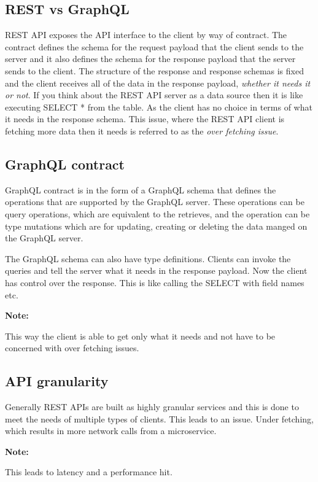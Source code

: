 \documentclass[a4paper, 11pt]{book}
\newenvironment{note}{
    \begin{siderule}
        \textbf{Note: }
        }{
    \end{siderule}
}
\begin{document}
    \subsection{REST vs GraphQL}
    REST API exposes the API interface to the client by way of contract.
    The contract defines the schema for the request payload that the client sends to the server and it also defines the schema for the response payload that the server sends to the client.
    The structure of the response and response schemas is fixed and the client receives all of the data in the response payload, \textit{whether it needs it or not}.
    If you think about the REST API server as a data source then it is like executing SELECT * from the table.
    As the client has no choice in terms of what it needs in the response schema.
    This issue, where the REST API client is fetching more data then it needs is referred to as the \textit{over fetching issue}.

    \subsection{GraphQL contract}
    GraphQL contract is in the form of a GraphQL schema that defines the operations that are supported by the GraphQL server.
    These operations can be query operations, which are equivalent to the retrieves, and the operation can be type mutations which are for updating, creating or deleting the data manged on the GraphQL server.

    The GraphQL schema can also have type definitions.
    Clients can invoke the queries and tell the server what it needs in the response payload.
    Now the client has control over the response.
    This is like calling the SELECT with field names etc.
    \begin{note}
        This way the client is able to get only what it needs and not have to be concerned with over fetching issues.
    \end{note}

    \subsection{API granularity}
    Generally REST APIs are built as highly granular services and this is done to meet the needs of multiple types of clients.
    This leads to an issue.
    Under fetching, which results in more network calls from a microservice.
    \begin{note}
        This leads to latency and a performance hit.
    \end{note}
\end{document}
